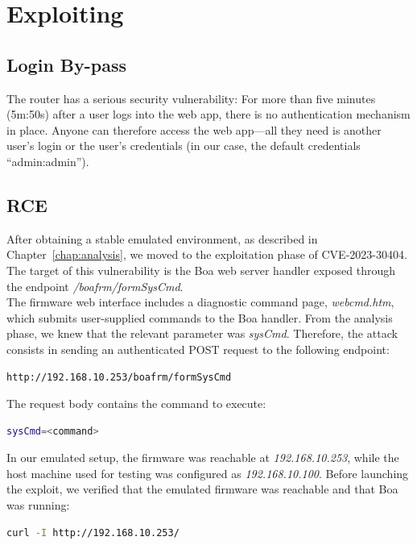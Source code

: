 \chapter{Exploiting}
\label{chap:exploiting}
    \section{Login By-pass}
        The router has a serious security vulnerability: For more than five minutes (5m:50s) after a user logs into the web app, there is no authentication mechanism in place. Anyone can therefore access the web app—all they need is another user’s login or the user’s credentials (in our case, the default credentials “admin:admin”).

    \section{RCE}
        After obtaining a stable emulated environment, as described in Chapter~\ref{chap:analysis}, we moved to the exploitation phase of CVE-2023-30404. The target of this vulnerability is the Boa web server handler exposed through the endpoint \emph{/boafrm/formSysCmd}.
        \\
        The firmware web interface includes a diagnostic command page, \emph{webcmd.htm}, which submits user-supplied commands to the Boa handler. From the analysis phase, we knew that the relevant parameter was \emph{sysCmd}. Therefore, the attack consists in sending an authenticated POST request to the following endpoint:

\begin{lstlisting}[language=bash]
http://192.168.10.253/boafrm/formSysCmd
\end{lstlisting}

        The request body contains the command to execute:

\begin{lstlisting}[language=bash]
sysCmd=<command>
\end{lstlisting}

            In our emulated setup, the firmware was reachable at \emph{192.168.10.253}, while the host machine used for testing was configured as \emph{192.168.10.100}. Before launching the exploit, we verified that the emulated firmware was reachable and that Boa was running:

\begin{lstlisting}[language=bash]
curl -I http://192.168.10.253/
\end{lstlisting}

